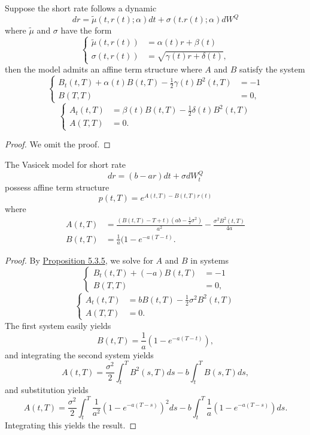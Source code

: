 \documentclass[11pt,fleqn]{book} %
\begin{document}
\begin{proposition} \label{prop:535}
Suppose the short rate follows a dynamic
\[
dr = \tilde{\mu}(t, r(t); \alpha)dt + \sigma(t. r(t); \alpha)dW^Q
\]
where \(\tilde{\mu}\) and \(\sigma\) have the form
\[
\left\{
\begin{array}{rl}
\tilde{\mu}(t, r(t)) &= \alpha(t)r + \beta(t) \\
\sigma(t, r(t)) &= \sqrt{\gamma(t)r + \delta(t)},
\end{array}
\right.
\]
then the model admits an affine term structure where \(A\) and \(B\) satisfy the system
\[
\left\{
\begin{array}{rl}
B_t(t, T) + \alpha(t)B(t, T) - \frac12\gamma(t)B^2(t, T) &= -1 \\
B(T, T) &= 0,
\end{array}
\right.
\]
\[
\left\{
\begin{array}{rl}
A_t(t, T) &= \beta(t)B(t, T) - \frac12\delta(t)B^2(t, T) \\
A(T, T) &= 0.
\end{array}
\right.
\]
\end{proposition}
\begin{proof}
    We omit the proof.
\end{proof}

\begin{corollary} \label{cor:536}
The Vasicek model for short rate
\[
dr = (b - ar)dt + \sigma dW_t^Q
\]
possess affine term structure
\[
p(t, T) = e^{A(t, T) - B(t, T)r(t)}
\]
where
\[
\begin{aligned}
A(t, T) &= \frac{(B(t, T) - T + t)\left(ab - \frac12\sigma^2\right)}{a^2} - \frac{\sigma^2B^2(t, T)}{4a} \\
B(t, T) &= \frac1a(1 - e^{-a(T - t)}.
\end{aligned}
\]
\end{corollary}
\begin{proof} By \hyperref[prop:535]{Proposition 5.3.5}, we solve for \(A\) and \(B\) in systems
\[
\left\{
\begin{array}{rl}
B_t(t, T) + (-a)B(t, T) &= -1 \\
B(T, T) &= 0,
\end{array}
\right.
\]
\[
\left\{
\begin{array}{rl}
A_t(t, T) &= bB(t, T) - \frac12\sigma^2B^2(t, T) \\
A(T, T) &= 0.
\end{array}
\right.
\]
\indent The first system easily yields
\[
B(t, T) = \frac1a(1 - e^{-a(T - t)}),
\]
and integrating the second system yields
\[
A(t, T) = \frac{\sigma^2}{2}\int_t^TB^2(s, T)ds - b\int_t^TB(s, T)ds,
\]
and substitution yields
\[
A(t, T) = \frac{\sigma^2}{2}\int_t^T\frac{1}{a^2}(1 - e^{-a(T - s)})^2ds - b\int_t^T\frac1a(1 - e^{-a(T - s)})ds.
\]
\indent Integrating this yields the result.
\end{proof}
\end{document}
